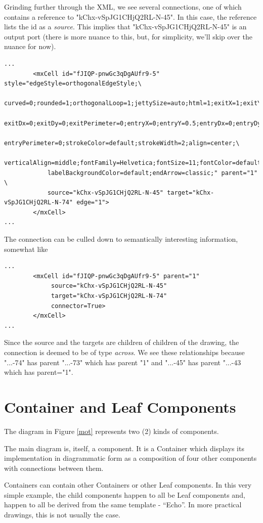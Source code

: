 \documentclass[10pt,anonymous,review]{acmart}
\begin{document}
Grinding further through the XML, we see several connections, one of which contains a reference to "kChx-vSpJG1CHjQ2RL-N-45". In this case, the reference lists the id as a \emph{source}. This implies that "kChx-vSpJG1CHjQ2RL-N-45" is an output port (there is more nuance to this, but, for simplicity, we'll skip over the nuance for now).
\begin{verbatim}
...
        <mxCell id="fJIQP-pnwGc3qDgAUfr9-5" style="edgeStyle=orthogonalEdgeStyle;\
            curved=0;rounded=1;orthogonalLoop=1;jettySize=auto;html=1;exitX=1;exitY=0.5;\
            exitDx=0;exitDy=0;exitPerimeter=0;entryX=0;entryY=0.5;entryDx=0;entryDy=0;\
            entryPerimeter=0;strokeColor=default;strokeWidth=2;align=center;\
            verticalAlign=middle;fontFamily=Helvetica;fontSize=11;fontColor=default;\
            labelBackgroundColor=default;endArrow=classic;" parent="1" \
            source="kChx-vSpJG1CHjQ2RL-N-45" target="kChx-vSpJG1CHjQ2RL-N-74" edge="1">
        </mxCell>
...  
\end{verbatim}
The connection can be culled down to semantically interesting information, somewhat like
\begin{verbatim}
...
        <mxCell id="fJIQP-pnwGc3qDgAUfr9-5" parent="1"
             source="kChx-vSpJG1CHjQ2RL-N-45"
             target="kChx-vSpJG1CHjQ2RL-N-74"
             connector=True>
        </mxCell>
...  
\end{verbatim}
Since the source and the targets are children of children of the drawing, the connection is deemed to be of type \emph{across}.
We see these relationships because "...-74" has parent "...-73" which has parent "1" and "...-45" has parent "...-43 which has parent="1". 

\section{Container and Leaf Components} \label{containerleaf}
The diagram in Figure \ref{mot} represents two (2) kinds of components.

The main diagram is, itself, a component. It is a Container which displays its implementation in diagrammatic form as a composition of four other components with connections between them.

Containers can contain other Containers or other Leaf components. In this very simple example, the child components happen to all be Leaf components and, happen to all be derived from the same template - “Echo”. In more practical drawings, this is not usually the case.
\end{document}
